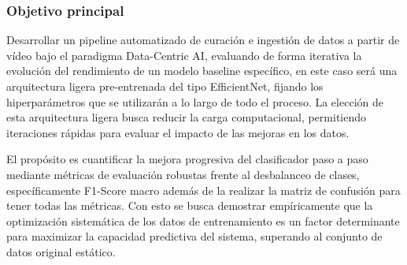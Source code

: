 ﻿\documentclass[10pt,a4paper,twocolumn,twoside]{article}
\begin{document}
\subsubsection{Objetivo principal}
Desarrollar un pipeline automatizado de curación e ingestión de datos a partir de vídeo bajo el paradigma Data-Centric AI, evaluando de forma iterativa la evolución del rendimiento de un modelo baseline específico, en este caso será una arquitectura ligera pre-entrenada del tipo EfficientNet\cite{tan2019efficientnet}, fijando los hiperparámetros que se utilizarán a lo largo de todo el proceso. La elección de esta arquitectura ligera busca reducir la carga computacional, permitiendo iteraciones rápidas para evaluar el impacto de las mejoras en los datos.

El propósito es cuantificar la mejora progresiva del clasificador paso a paso mediante métricas de evaluación robustas frente al desbalanceo de clases, específicamente F1-Score macro además de la realizar la matriz de confusión para tener todas las métricas. Con esto se busca demostrar empíricamente que la optimización sistemática de los datos de entrenamiento es un factor determinante para maximizar la capacidad predictiva del sistema, superando al conjunto de datos original estático.
\end{document}
